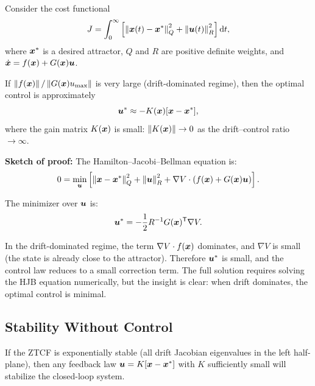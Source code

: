 \begin{theorem}
\label{thm:ch7:minimal-intervention-full}
Consider the cost functional
\begin{equation}
J = \int_0^\infty \left[\left\lVert \bm{x}(t) - \bm{x}^* \right\rVert^2_Q + \left\lVert \bm{u}(t) \right\rVert^2_R\right] \mathrm{d}t,
\label{eq:ch7:lqr-cost}
\end{equation}
where $\bm{x}^*$ is a desired attractor, $Q$ and $R$ are positive definite weights, and $\dot{\bm{x}} = f(\bm{x}) + G(\bm{x})\bm{u}$.

If $\left\lVert f(\bm{x}) \right\rVert/\left\lVert G(\bm{x})u_{\max} \right\rVert$ is very large (drift-dominated regime), then the
optimal control is approximately
\begin{equation}
\bm{u}^* \approx -K(\bm{x})[\bm{x} - \bm{x}^*],
\label{eq:ch7:minimal-control-law}
\end{equation}
where the gain matrix $K(\bm{x})$ is small: $\left\lVert K(\bm{x}) \right\rVert \to 0$ as the drift--control ratio
$\to\infty$.
\end{theorem}

\noindent\textbf{Sketch of proof:} The Hamilton--Jacobi--Bellman equation is:
\begin{equation}
0 = \min_{\bm{u}} \left[\left\lVert \bm{x}-\bm{x}^* \right\rVert^2_Q + \left\lVert \bm{u} \right\rVert^2_R + \nabla V \cdot (f(\bm{x}) + G(\bm{x})\bm{u})\right].
\end{equation}

The minimizer over $\bm{u}$ is:
\begin{equation}
\bm{u}^* = -\frac{1}{2}R^{-1}G(\bm{x})^{\mathsf{T}}\nabla V.
\end{equation}

In the drift-dominated regime, the term $\nabla V \cdot f(\bm{x})$ dominates, and $\nabla V$ is
small (the state is already close to the attractor). Therefore $\bm{u}^*$ is small, and the
control law reduces to a small correction term. The full solution requires solving the HJB
equation numerically, but the insight is clear: when drift dominates, the optimal control
is minimal.

\subsection{Stability Without Control}

\begin{proposition}
\label{prop:ch7:ztcf-stability}
If the ZTCF is exponentially stable (all drift Jacobian eigenvalues in the left half-plane),
then any feedback law $\bm{u} = K[\bm{x} - \bm{x}^*]$ with $K$ sufficiently small will stabilize the
closed-loop system.
\end{proposition}

